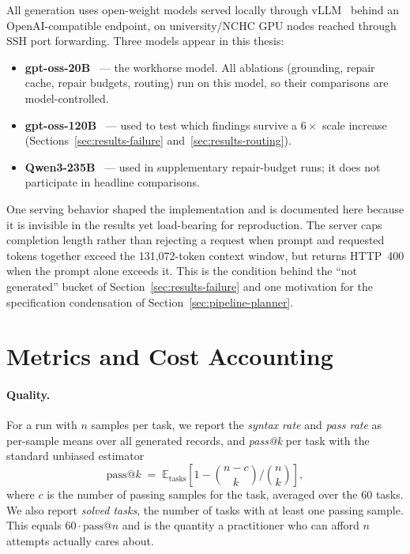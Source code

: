 All generation uses open-weight models served locally through
vLLM~\citep{kwon2023vllm} behind an OpenAI-compatible endpoint, on
university/NCHC GPU nodes reached through SSH port forwarding. Three models
appear in this thesis:

\begin{itemize}
  \item \textbf{gpt-oss-20B}~\citep{openai2025gptoss} --- the workhorse model.
    All ablations (grounding, repair cache, repair budgets, routing) run on
    this model, so their comparisons are model-controlled.
  \item \textbf{gpt-oss-120B}~\citep{openai2025gptoss} --- used to test which
    findings survive a $6\times$ scale increase
    (Sections~\ref{sec:results-failure} and~\ref{sec:results-routing}).
  \item \textbf{Qwen3-235B}~\citep{yang2025qwen3} --- used in supplementary
    repair-budget runs; it does not participate in headline comparisons.
\end{itemize}

One serving behavior shaped the implementation and is documented here
because it is invisible in the results yet load-bearing for
reproduction. The server caps completion length rather than rejecting a
request when prompt and requested tokens together exceed the
131{,}072-token context window, but returns HTTP~400 when the prompt
alone exceeds it. This is the condition behind the ``not generated'' bucket
of Section~\ref{sec:results-failure} and one motivation for the
specification condensation of Section~\ref{sec:pipeline-planner}.

\section{Metrics and Cost Accounting}
\label{sec:setup-metrics}

\paragraph{Quality.}
For a run with $n$ samples per task, we report the \emph{syntax rate} and
\emph{pass rate} as per-sample means over all generated records, and
\emph{pass@k} per task with the standard unbiased
estimator~\citep{chen2021humaneval}
\[
  \text{pass@}k \;=\; \mathbb{E}_{\text{tasks}}
  \left[ 1 - \binom{n-c}{k} \Big/ \binom{n}{k} \right],
\]
where $c$ is the number of passing samples for the task, averaged over the 60
tasks. We also report \emph{solved tasks}, the number of tasks with
at least one passing sample. This equals $60 \cdot \text{pass@}n$ and is the
quantity a practitioner who can afford $n$ attempts actually cares about.

